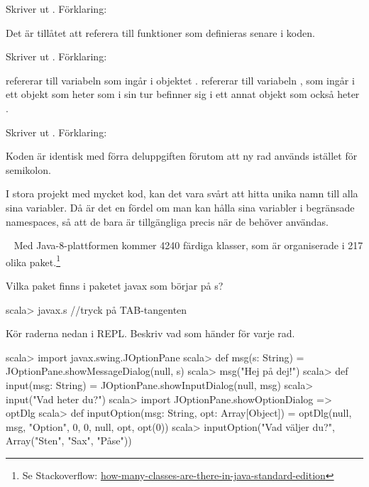 \SubtaskSolved  Skriver ut . Förklaring:

Det är tillåtet att referera till funktioner som definieras senare i koden.

\SubtaskSolved  Skriver ut . Förklaring:

 refererar till variabeln  som ingår i objektet .
 refererar till variabeln , som ingår i ett objekt som heter  som i sin tur befinner sig i ett annat objekt som också heter .

\SubtaskSolved  Skriver ut . Förklaring:

Koden är identisk med förra deluppgiften förutom att ny rad används istället för semikolon.

\SubtaskSolved  I stora projekt med mycket kod, kan det vara svårt att hitta unika namn till alla sina variabler. Då är det en fördel om man kan hålla sina variabler i begränsade namespaces, så att de bara är tillgängliga precis när de behöver användas. 



\QUESTEND









\QUESTBEGIN

\Task \label{task:package} \what~   Med Java-8-plattformen kommer 4240 färdiga klasser, som är organiserade i 217 olika paket.\footnote{Se Stackoverflow: \href{http://stackoverflow.com/questions/3112882/how-many-classes-are-there-in-java-standard-edition}{how-many-classes-are-there-in-java-standard-edition}}

\Subtask Vilka paket finns i paketet javax som börjar på s?

\begin{REPLnonum}
scala> javax.s   //tryck på TAB-tangenten
\end{REPLnonum}

\Subtask Kör raderna nedan i REPL. Beskriv vad som händer för varje rad.
\begin{REPL}[numbers=left, numberstyle=\color{black}\ttfamily\scriptsize\selectfont]
scala> import javax.swing.JOptionPane
scala> def msg(s: String) = JOptionPane.showMessageDialog(null, s)
scala> msg("Hej på dej!")
scala> def input(msg: String) = JOptionPane.showInputDialog(null, msg)
scala> input("Vad heter du?")
scala> import JOptionPane.{showOptionDialog => optDlg}
scala> def inputOption(msg: String, opt: Array[Object]) =
         optDlg(null, msg, "Option", 0, 0, null, opt, opt(0))
scala> inputOption("Vad väljer du?", Array("Sten", "Sax", "Påse"))
\end{REPL}


